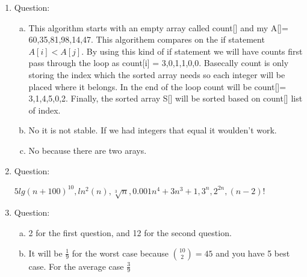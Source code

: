 \documentclass{article}
\begin{document}
\begin{enumerate}
  \item Question:
  \begin{enumerate}[(a)]
    \item
    This algorithm starts with an empty array called count[] and my A[]= 60,35,81,98,14,47.
    This algorithem compares on the if statement $A[i] < A[j]$. By using this kind of if statement
    we will have counts first pass through the loop as count[i] = 3,0,1,1,0,0. Basecally count is only storing the index which the sorted array needs so each integer will be placed where it belongs. In the end of the loop count will be count[]= 3,1,4,5,0,2. Finally, the sorted array S[] will be sorted based on count[] list of index.
    \item
    No it is not stable. If we had integers that equal it woulden't work.
    \item No because there are two arays.

  \end{enumerate}
  \item Question:

  $5lg(n+100)^{10}, ln^2(n), \sqrt[3]{n}, 0.001n^4+3n^3+1, 3^n, 2^{2n}, (n-2)!$

  \item Question:
  \begin{enumerate}[(a)]

    \item 2 for the first question, and 12 for the second question.

    \item It will be $\frac{1}{9}$ for the worst case because  $\binom{10}{2}=45$ and you have 5 best case. For the average case $\frac{3}{9}$


  \end{enumerate}

\end{enumerate}
\end{document}

